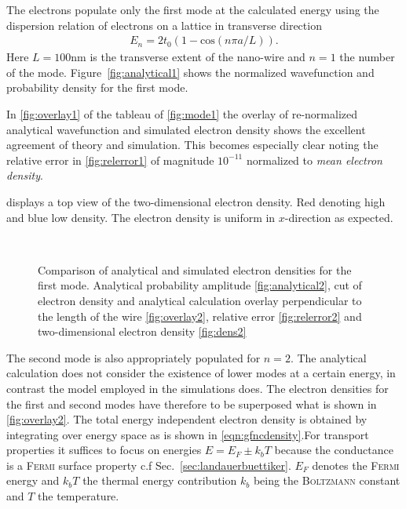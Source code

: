 The electrons populate only the first mode at the calculated energy using the dispersion relation of electrons on a lattice in transverse direction
\begin{align}
E_{n} = 2t_0(1-\text{cos}(n\pi a/L)).
\label{eqn:dispersionlattice}
\end{align}
Here $L=100$nm is the transverse extent of the nano-wire and $n=1$ the number of the mode. Figure~\ref{fig:analytical1} shows the normalized wavefunction and probability density for the first mode.\par
In \cref{fig:overlay1} of the tableau of \cref{fig:mode1} the overlay of re-normalized analytical wavefunction and simulated electron density shows the excellent agreement of theory and simulation. This becomes especially clear noting the relative error in \cref{fig:relerror1} of magnitude $10^{-11}$ normalized to \emph{mean electron density}.\par
{} displays a top view of the two-dimensional electron density. Red denoting high and blue low density. The electron density is uniform in $x$-direction as expected.\par
\begin{figure}[h]
  \begin{center}
 \qquad
    \\
    \qquad
    \caption{Comparison of analytical and simulated electron densities for the first mode. Analytical probability amplitude \ref{fig:analytical2}, cut of electron density and analytical calculation overlay perpendicular to the length of the wire \ref{fig:overlay2}, relative error \ref{fig:relerror2} and two-dimensional electron density \ref{fig:dens2}}\label{fig:mode2}
  \end{center}
\end{figure}
The second mode is also appropriately populated for $n=2$. The analytical calculation does not consider the existence of lower modes at a certain energy, in contrast the model employed in the simulations does. The electron densities for the first and second modes have therefore to be superposed what is shown in \cref{fig:overlay2}. The total energy independent electron density is obtained by integrating over energy space as is shown in \cref{eqn:gfncdensity}.For transport properties it suffices to focus on energies $E=E_F\pm k_bT$ because the conductance is a \textsc{Fermi} surface property c.f Sec.~\ref{sec:landauerbuettiker}. $E_F$ denotes the \textsc{Fermi} energy and $k_bT$ the thermal energy contribution $k_b$ being the \textsc{Boltzmann} constant and $T$ the temperature.\par
